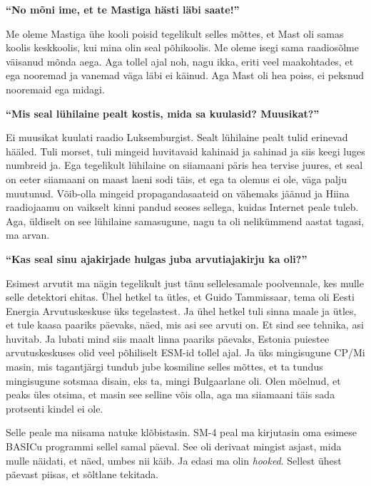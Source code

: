 \textbf{\enquote{No mõni ime, et te Mastiga hästi läbi saate!}}

Me oleme Mastiga ühe kooli poisid tegelikult selles mõttes, et Mast oli samas 
koolis keskkoolis, kui mina olin seal põhikoolis. Me oleme isegi sama 
raadiosõlme väisanud mõnda aega. Aga tollel ajal noh, nagu ikka, eriti veel 
maakohtades, et ega nooremad ja vanemad väga läbi ei käinud. Aga Mast oli hea 
poiss, ei peksnud nooremaid ega midagi. 

\textbf{\enquote{Mis seal lühilaine pealt kostis, mida sa kuulasid? Muusikat?}}

Ei muusikat kuulati raadio Luksemburgist. Sealt lühilaine pealt tulid erinevad 
hääled. Tuli morset, tuli mingeid huvitavaid kahinaid ja sahinad ja siis keegi 
luges numbreid ja. Ega tegelikult lühilaine on siiamaani päris hea tervise 
juures, et seal on  eeter siiamaani on  maast laeni sodi täis, et ega ta olemus 
ei ole, väga palju muutunud. Võib-olla mingeid propagandasaateid on vähemaks 
jäänud ja Hiina raadiojaamu on vaikselt kinni pandud seoses sellega, kuidas 
Internet peale tuleb. Aga, üldiselt on see lühilaine samasugune, nagu ta oli 
nelikümmend aastat tagasi, ma arvan.

\textbf{\enquote{Kas seal sinu ajakirjade hulgas juba arvutiajakirju ka oli?}}

Esimest arvutit ma nägin tegelikult just tänu sellelesamale poolvennale, kes 
mulle selle detektori ehitas. Ühel hetkel ta ütles, et Guido 
Tammissaar, tema oli Eesti Energia 
Arvutuskeskuse üks tegelastest. Ja ühel 
hetkel tuli sinna maale ja ütles, et tule kaasa paariks päevaks, näed, mis asi 
see arvuti on. Et sind see tehnika, asi huvitab. Ja lubati mind siis maalt 
linna paariks päevaks, Estonia puiestee arvutuskeskuses olid veel põhiliselt 
ESM-id tollel ajal. Ja 
üks mingisugune CP/Mi 
masin, mis tagantjärgi tundub jube kosmiline selles mõttes, et ta tundus 
mingisugune sotsmaa disain, eks ta, mingi Bulgaarlane oli. Olen mõelnud, et 
peaks üles otsima, et  masin see selline võis olla, aga ma siiamaani täis sada 
protsenti kindel ei ole. 

Selle peale ma niisama natuke klõbistasin. 
SM-4 peal ma 
kirjutasin oma esimese BASICu programmi sellel samal 
päeval. See oli derivaat mingist asjast, mida mulle näidati, et näed, umbes nii 
käib. Ja edasi ma olin \emph{hooked}. Sellest ühest päevast piisas, et sõltlane 
tekitada. 

